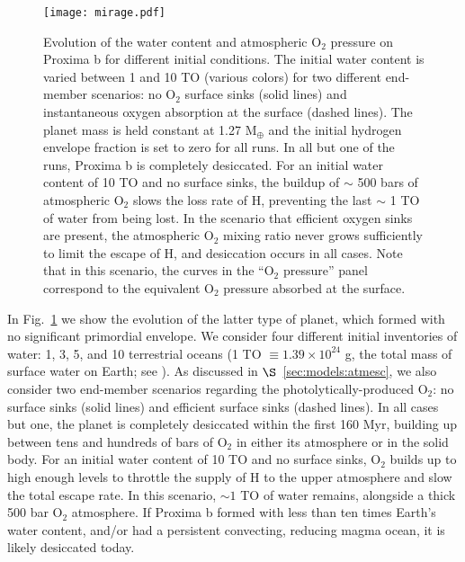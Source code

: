 \documentclass[preprint,12pt]{aastex}
\begin{document}
\begin{figure}[ht]
\centering
\texttt{[image: mirage.pdf]}
\caption{Evolution of the water content and atmospheric O$_2$ pressure
  on Proxima b for different initial conditions. The initial water
  content is varied between 1 and 10 TO (various colors) for two
  different end-member scenarios: no O$_2$ surface sinks (solid lines)
  and instantaneous oxygen absorption at the surface (dashed
  lines). The planet mass is held constant at 1.27 M$_\oplus$ and the
  initial hydrogen envelope fraction is set to zero for all runs. In
  all but one of the runs, Proxima b is completely desiccated. For an
  initial water content of 10 TO and no surface sinks, the buildup of
  $\sim$ 500 bars of atmospheric O$_2$ slows the loss rate of H,
  preventing the last $\sim$ 1 TO of water from being lost. In the
  scenario that efficient oxygen sinks are present, the atmospheric
  O$_2$ mixing ratio never grows sufficiently to limit the escape of
  H, and desiccation occurs in all cases. Note that in this scenario,
  the curves in the ``O$_2$ pressure'' panel correspond to the
  equivalent O$_2$ pressure absorbed at the surface.}
\label{fig:atmesc:mirage}
\end{figure}

In Fig.~\ref{fig:atmesc:mirage} we show the evolution of the latter
type of planet, which formed with no significant primordial
envelope. We consider four different initial inventories of water: 1,
3, 5, and 10 terrestrial oceans (1 TO $\equiv 1.39\times 10^{24}$ g,
the total mass of surface water on Earth; see \cite{Kasting88}). As
discussed in $\S$~\ref{sec:models:atmesc}, we also consider two end-member
scenarios regarding the photolytically-produced O$_2$: no surface
sinks (solid lines) and efficient surface sinks (dashed lines). In all
cases but one, the planet is completely desiccated within the first
160 Myr, building up between tens and hundreds of bars of O$_2$ in
either its atmosphere or in the solid body. For an initial water
content of 10 TO and no surface sinks, O$_2$ builds up to high enough
levels to throttle the supply of H to the upper atmosphere and slow
the total escape rate. In this scenario, $\sim 1$ TO of water remains,
alongside a thick 500 bar O$_2$ atmosphere. If Proxima b formed with
less than ten times Earth's water content, and/or had a persistent
convecting, reducing magma ocean, it is likely desiccated today.
\end{document}
